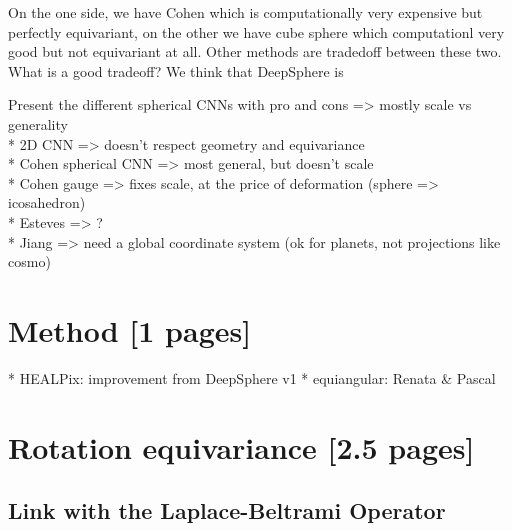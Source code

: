 \documentclass{article} %
\begin{document}
On the one side, we have Cohen which is computationally very expensive but perfectly equivariant, on the other we have cube sphere which computationl very good but not equivariant at all. Other methods are tradedoff between these two. What is a good tradeoff? We think that DeepSphere is

Present the different spherical CNNs with pro and cons => mostly scale vs generality\\
* 2D CNN => doesn't respect geometry and equivariance\\
* Cohen spherical CNN => most general, but doesn't scale\\
* Cohen gauge => fixes scale, at the price of deformation (sphere => icosahedron)\\
* Esteves => ? \\
* Jiang => need a global coordinate system (ok for planets, not projections like cosmo)\\

\section{Method [1 pages]}

* HEALPix: improvement from DeepSphere v1 \cite{perraudin2019deepsphere}
* equiangular: Renata \& Pascal

\section{Rotation equivariance [2.5 pages]}

\subsection{Link with the Laplace-Beltrami Operator}
\end{document}
